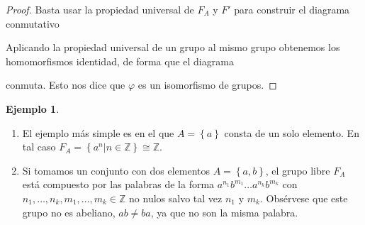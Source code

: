 \documentclass[12pt,a4paper]{book}
\theoremstyle{definition} \newtheorem{defn}[thm]{Definición}
\theoremstyle{definition} \newtheorem{ejemplo}[thm]{Ejemplo}
\theoremstyle{definition} \newtheorem{ejercicio}[thm]{Ejercicio}
\theoremstyle{remark} \newtheorem*{obs}{Observación}
\def\ZZ{\mathbb{Z}}
\def\id{\mathbf{1}}
\begin{document}
 \begin{proof}
   Basta usar la propiedad universal de $F_A$ y $F'$ para construir el diagrama conmutativo
  \begin{center}
   \end{center}
   Aplicando la propiedad universal de un grupo al mismo grupo obtenemos los homomorfismos identidad, de forma que el diagrama
   \begin{center}
   \end{center}
   conmuta. Esto nos dice que $\varphi$ es un isomorfismo de grupos.
 \end{proof}

 \begin{ejemplo} \leavevmode
   \begin{enumerate}
     \item El ejemplo más simple es en el que $A=\left\{ a \right\}$ consta de un solo elemento. En tal caso $F_{A}=\left\{ a^n|n\in \ZZ \right\}\cong \ZZ$. 

     \item Si tomamos un conjunto con dos elementos $A=\left\{ a,b \right\}$, el grupo libre $F_{A}$ está compuesto por las palabras de la forma $a^{n_1}b^{m_1}\dots a^{n_k}b^{m_k}$ con $n_1,\dots,n_k,m_1,\dots,m_k\in \ZZ$ no nulos salvo tal vez $n_1$ y $m_k$. Obsérvese que este grupo no es abeliano, $ab\neq ba$, ya que no son la misma palabra.
   \end{enumerate}
 \end{ejemplo}
\end{document}
